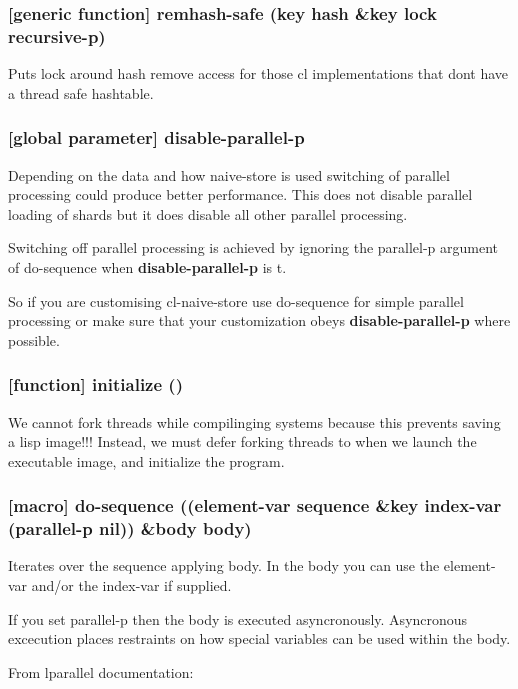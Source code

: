 \documentclass[11pt]{article}
\begin{document}
\subsubsection{[generic function] remhash-safe (key hash \&key lock recursive-p)}
\label{sec:orge0ba26a}

Puts lock around hash remove access for those cl implementations that
dont have a thread safe hashtable.

\subsubsection{[global parameter] \textbf{disable-parallel-p}}
\label{sec:org80d7f2b}

Depending on the data and how naive-store is used switching of
parallel processing could produce better performance. This does not
disable parallel loading of shards but it does disable all other
parallel processing.

Switching off parallel processing is achieved by ignoring the
parallel-p argument of do-sequence when \textbf{disable-parallel-p} is t.

So if you are customising cl-naive-store use do-sequence for simple
parallel processing or make sure that your customization obeys
\textbf{disable-parallel-p} where possible.

\subsubsection{[function] initialize ()}
\label{sec:orge565565}

We cannot fork threads while compilinging systems because this
prevents saving a lisp image!!!  Instead, we must defer forking
threads to when we launch the executable image, and initialize the
program.

\subsubsection{[macro] do-sequence ((element-var sequence \&key index-var (parallel-p nil)) \&body body)}
\label{sec:org4508448}

Iterates over the sequence applying body. In the body you can use the
element-var and/or the index-var if supplied.

If you set parallel-p then the body is executed
asyncronously. Asyncronous excecution places restraints on how special
variables can be used within the body.

From lparallel documentation:
\end{document}
